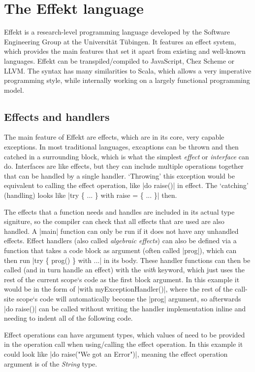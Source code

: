\chapter{The Effekt language}\label{chap:effekt}

Effekt is a research-level programming language developed by the Software Engineering Group at the Universität Tübingen. It features an effect system, which provides the main features that set it apart from existing and well-known languages. Effekt can be transpiled/compiled to JavaScript, Chez Scheme or LLVM. The syntax has many similarities to Scala, which allows a very imperative programming style, while internally working on a largely functional programming model.

\section{Effects and handlers}

The main feature of Effekt are effects, which are in its core, very capable exceptions. In most traditional languages, excaptions can be thrown and then catched in a surrounding block, which is what the simplest \textit{effect} or \textit{interface} can do. Interfaces are like effects, but they can include multiple operations together that can be handled by a single handler. `Throwing' this exception would be equivalent to calling the effect operation, like |do raise()| in effect. The `catching' (handling) looks like |try \{ ... \} with raise = \{ ... \}| then.

The effects that a function needs and handles are included in its actual type signiture, so the compiler can check that all effects that are used are also handled. A |main| function can only be run if it does not have any unhandled effects. Effect handlers (also called \textit{algebraic effects}) can also be defined via a function that takes a code block as argument (often called |prog|), which can then run |try \{ prog() \} with ...| in its body. These handler functions can then be called (and in turn handle an effect) with the \textit{with} keyword, which just uses the rest of the current scope`s code as the first block argument. In this example it would be in the form of |with myExceptionHandler()|, where the rest of the call-site scope`s code will automatically become the |prog| argument, so afterwards |do raise()| can be called without writing the handler implementation inline and needing to indent all of the following code.

Effect operations can have argument types, which values of need to be provided in the operation call when using/calling the effect operation. In this example it could look like |do raise("We got an Error")|, meaning the effect operation argument is of the \textit{String} type.

